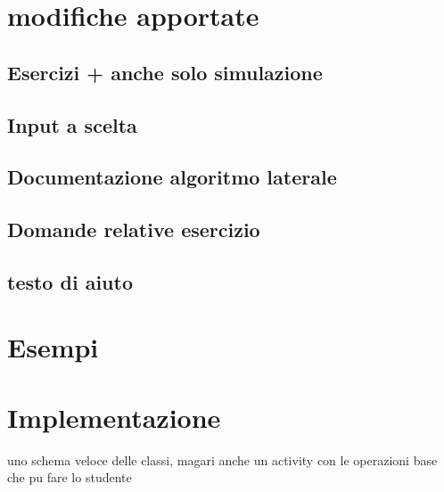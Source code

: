 \section{modifiche apportate}


\subsection{Esercizi + anche solo simulazione}


\subsection{Input a scelta}


\subsection{Documentazione algoritmo laterale}


\subsection{Domande relative esercizio}


\subsection{testo di aiuto}


\section{Esempi}


\section{Implementazione}

uno schema veloce delle classi, magari anche un activity con le operazioni
base che pu fare lo studente
